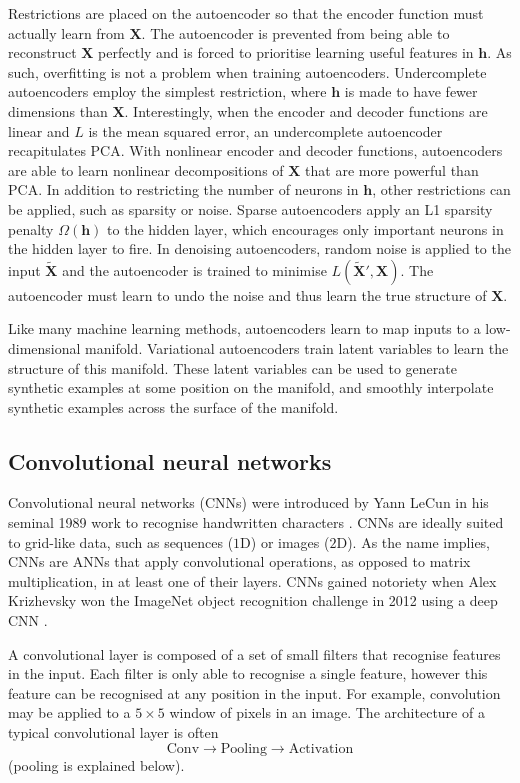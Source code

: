 Restrictions are placed on the autoencoder so that the encoder function must actually learn from $\mathbf{X}$.
The autoencoder is prevented from being able to reconstruct $\mathbf{X}$ perfectly and is forced to prioritise learning useful features in $\mathbf{h}$. As such, overfitting is not a problem when training autoencoders.
Undercomplete autoencoders employ the simplest restriction, where $\mathbf{h}$ is made to have fewer dimensions than $\mathbf{X}$. 
Interestingly, when the encoder and decoder functions are linear and $L$ is the mean squared error, an undercomplete autoencoder recapitulates PCA.
With nonlinear encoder and decoder functions, autoencoders are able to learn nonlinear decompositions of $\mathbf{X}$ that are more powerful than PCA.
In addition to restricting the number of neurons in $\mathbf{h}$, other restrictions can be applied, such as sparsity or noise.
Sparse autoencoders apply an L1 sparsity penalty $\Omega(\mathbf{h})$ to the hidden layer, which encourages only important neurons in the hidden layer to fire.
In denoising autoencoders, random noise is applied to the input $\mathbf{\tilde{X}}$ and the autoencoder is trained to minimise $L(\mathbf{\tilde{X}}', \mathbf{X})$.
The autoencoder must learn to undo the noise and thus learn the true structure of $\mathbf{X}$.

Like many machine learning methods, autoencoders learn to map inputs to a low-dimensional manifold. Variational autoencoders train latent variables to learn the structure of this manifold. These latent variables can be used to generate synthetic examples at some position on the manifold, and smoothly interpolate synthetic examples across the surface of the manifold.

\subsection{Convolutional neural networks}

Convolutional neural networks (CNNs) were introduced by Yann LeCun in his seminal 1989 work to recognise handwritten characters \cite{LeCun1989}. CNNs are ideally suited to grid-like data, such as sequences ($1$D) or images ($2$D). As the name implies, CNNs are ANNs that apply convolutional operations, as opposed to matrix multiplication, in at least one of their layers. CNNs gained notoriety when Alex Krizhevsky won the ImageNet object recognition challenge in 2012 using a deep CNN \cite{Krizhevsky2012}.

A convolutional layer is composed of a set of small filters that recognise features in the input. Each filter is only able to recognise a single feature, however this feature can be recognised at any position in the input. For example, convolution may be applied to a $5\times 5$ window of pixels in an image. The architecture of a typical convolutional layer is often
\[
\text{Conv} \rightarrow \text{Pooling} \rightarrow \text{Activation}
\]
(pooling is explained below).

